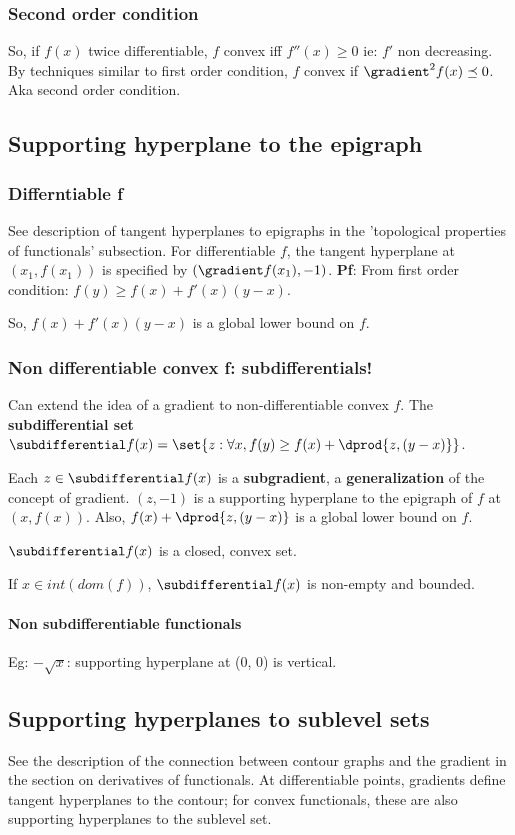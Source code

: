 \documentclass[oneside, article]{memoir}
\begin{document}
\subsubsection{Second order condition}
So, if $f(x)$ twice differentiable, $f$ convex iff $f''(x) \geq 0$ ie: $f'$ non decreasing. By techniques similar to first order condition, $f$ convex if $\gradient^{2}f(x) \preceq 0$. Aka second order condition.

\subsection{Supporting hyperplane to the epigraph}
\subsubsection{Differntiable f}
See description of tangent hyperplanes to epigraphs in the 'topological properties of functionals' subsection. For differentiable $f$, the tangent hyperplane at $(x_1, f(x_1))$ is specified by $(\gradient f(x_1), -1)$. \textbf{Pf}: From first order condition: $f(y) \geq f(x) + f'(x)(y-x)$.

So, $f(x) + f'(x)(y-x)$ is a global lower bound on $f$.

\subsubsection{Non differentiable convex f: subdifferentials!}
Can extend the idea of a gradient to non-differentiable convex $f$. The \textbf{subdifferential set} $\subdifferential f(x) = \set{z: \forall x, f(y) \geq f(x) + \dprod{z,(y-x)}}$.

Each $z \in \subdifferential f(x)$ is a \textbf{subgradient}, a \textbf{generalization} of the concept of gradient. $(z, -1)$ is a supporting hyperplane to the epigraph of $f$ at $(x, f(x))$. Also, $f(x) + \dprod{z,(y-x)}$ is a global lower bound on $f$.

$\subdifferential f(x)$ is a closed, convex set.

If $x \in int(dom(f))$, $\subdifferential f(x)$ is non-empty and bounded.

\paragraph*{Non subdifferentiable functionals}
Eg: $-\sqrt{x}$: supporting hyperplane at (0, 0) is vertical.

\subsection{Supporting hyperplanes to sublevel sets}
See the description of the connection between contour graphs and the gradient in the section on derivatives of functionals. At differentiable points, gradients define tangent hyperplanes to the contour; for convex functionals, these are also supporting hyperplanes to the sublevel set.
\end{document}
